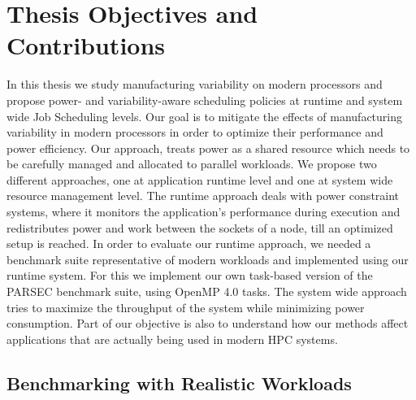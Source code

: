 \section{Thesis Objectives and Contributions}

In this thesis we study manufacturing variability on modern processors and propose power-
and variability-aware scheduling policies at runtime and system wide Job Scheduling
levels.  Our goal is to mitigate the effects of manufacturing variability in modern
processors in order to optimize their performance and power efficiency.  Our approach,
treats power as a shared resource which needs to be carefully managed and allocated to
parallel workloads.  We propose two different approaches, one at application runtime level
and one at system wide resource management level.  The runtime approach deals with power
constraint systems, where it monitors the application's performance during execution and
redistributes power and work between the sockets of a node, till an optimized setup is
reached.  In order to evaluate our runtime approach, we needed a benchmark suite
representative of modern workloads and implemented using our runtime system.  For this we
implement our own task-based version of the PARSEC benchmark suite, using OpenMP 4.0
tasks.  The system wide approach tries to maximize the throughput of the system while
minimizing power consumption.  Part of our objective is also to understand how our methods
affect applications that are actually being used in modern HPC systems.


\subsection{Benchmarking with Realistic Workloads}

